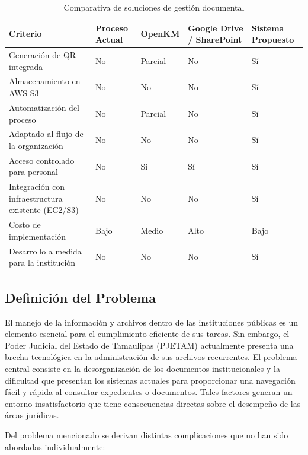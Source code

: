 \begin{table}[h]
\centering
\caption{Comparativa de soluciones de gestión documental}
\label{tab:comparativa}
\renewcommand{\arraystretch}{1.3}
\begin{tabular}{|p{3.5cm}|p{2cm}|p{2cm}|p{2.5cm}|p{2.5cm}|}
\hline
\textbf{Criterio} & \textbf{Proceso Actual} & \textbf{OpenKM} & \textbf{Google Drive / SharePoint} & \textbf{Sistema Propuesto} \\
\hline
Generación de QR integrada & No & Parcial & No & Sí \\
\hline
Almacenamiento en AWS S3 & No & No & No & Sí \\
\hline
Automatización del proceso & No & Parcial & No & Sí \\
\hline
Adaptado al flujo de la organización & No & No & No & Sí \\
\hline
Acceso controlado para personal & No & Sí & Sí & Sí \\
\hline
Integración con infraestructura existente (EC2/S3) & No & No & No & Sí \\
\hline
Costo de implementación & Bajo & Medio & Alto & Bajo \\
\hline
Desarrollo a medida para la institución & No & No & No & Sí \\
\hline
\end{tabular}
\end{table}

\subsection{Definición del Problema}
\label{sec:problema}
El manejo de la información y archivos dentro de las instituciones públicas es un elemento esencial para el cumplimiento eficiente de sus tareas. Sin embargo, el Poder Judicial del Estado de Tamaulipas (PJETAM) actualmente presenta una brecha tecnológica en la administración de sus archivos recurrentes. El problema central consiste en la desorganización de los documentos institucionales y la dificultad que presentan los sistemas actuales para proporcionar una navegación fácil y rápida al consultar expedientes o documentos. Tales factores generan un entorno insatisfactorio que tiene consecuencias directas sobre el desempeño de las áreas jurídicas. 

Del problema mencionado se derivan distintas complicaciones que no han sido abordadas individualmente:

